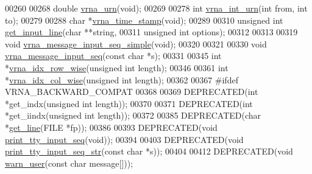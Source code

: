 \begin{DoxyCode}
00260 
00268 \textcolor{keywordtype}{double} \hyperlink{group__utils_ga384e256ebb295d04a14426179db0dd6e}{vrna\_urn}(\textcolor{keywordtype}{void});
00269 
00278 \textcolor{keywordtype}{int} \hyperlink{group__utils_ga46111bb3747dbcf4609f0d40ae169ad9}{vrna\_int\_urn}(\textcolor{keywordtype}{int} from, \textcolor{keywordtype}{int} to);
00279 
00288 \textcolor{keywordtype}{char}  *\hyperlink{group__utils_gad3bbe8d01afb1310609cb018d5290550}{vrna\_time\_stamp}(\textcolor{keywordtype}{void});
00289 
00310 \textcolor{keywordtype}{unsigned} \textcolor{keywordtype}{int} \hyperlink{group__utils_ga8ef1835eb83f542396f59f0b205965e5}{get\_input\_line}(\textcolor{keywordtype}{char} **\textcolor{keywordtype}{string},
00311                             \textcolor{keywordtype}{unsigned} \textcolor{keywordtype}{int} options);
00312 
00313 
00319 \textcolor{keywordtype}{void} \hyperlink{group__utils_gaee1dd652ca5b9e56b096963a1576f73b}{vrna\_message\_input\_seq\_simple}(\textcolor{keywordtype}{void});
00320 
00321 
00330 \textcolor{keywordtype}{void} \hyperlink{group__utils_gaf4d194d558b0c975f269de01dea52460}{vrna\_message\_input\_seq}(\textcolor{keyword}{const} \textcolor{keywordtype}{char} *s);
00331 
00345 \textcolor{keywordtype}{int} *\hyperlink{group__utils_ga70b180e9ea764218a82647a1cd347445}{vrna\_idx\_row\_wise}(\textcolor{keywordtype}{unsigned} \textcolor{keywordtype}{int} length);
00346 
00361 \textcolor{keywordtype}{int} *\hyperlink{group__utils_ga89ebc69c52fa0c78c9e1974b0017746b}{vrna\_idx\_col\_wise}(\textcolor{keywordtype}{unsigned} \textcolor{keywordtype}{int} length);
00362 
00367 \textcolor{preprocessor}{#ifdef  VRNA\_BACKWARD\_COMPAT}
00368 
00369 DEPRECATED(\textcolor{keywordtype}{int}   *get\_indx(\textcolor{keywordtype}{unsigned} \textcolor{keywordtype}{int} length));
00370 
00371 DEPRECATED(\textcolor{keywordtype}{int}   *get\_iindx(\textcolor{keywordtype}{unsigned} \textcolor{keywordtype}{int} length));
00372 
00385 DEPRECATED(\textcolor{keywordtype}{char}  *\hyperlink{utils_8h_abe51806d14cff0789a8c1df7dbc45b71}{get\_line}(FILE *fp));
00386 
00393 DEPRECATED(\textcolor{keywordtype}{void} \hyperlink{utils_8h_a6bf778117d31b7fd90db435323f4ef74}{print\_tty\_input\_seq}(\textcolor{keywordtype}{void}));
00394 
00403 DEPRECATED(\textcolor{keywordtype}{void} \hyperlink{utils_8h_ae4ef89b662a3e9b5b5f0781d9757aba0}{print\_tty\_input\_seq\_str}(\textcolor{keyword}{const} \textcolor{keywordtype}{char} *s));
00404 
00412 DEPRECATED(\textcolor{keywordtype}{void} \hyperlink{utils_8h_af2355fa8746f2f30fbe71db65dea3d51}{warn\_user}(\textcolor{keyword}{const} \textcolor{keywordtype}{char} message[]));

\end{DoxyCode}
